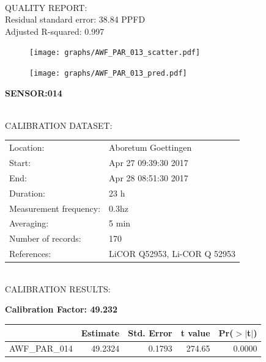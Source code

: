 \documentclass[oneside]{report}
\begin{document}
\hrulefill\\
QUALITY REPORT:\\
Residual standard error: 38.84 PPFD\\
Adjusted R-squared: 0.997



\begin{figure}[H]
  \centering
  \texttt{[image: graphs/AWF\_PAR\_013\_scatter.pdf]}
\end{figure}




\begin{figure}[H]
  \centering
  \texttt{[image: graphs/AWF\_PAR\_013\_pred.pdf]}
\end{figure}

\pagebreak


\begin{center}
\large{\textbf{SENSOR:014}}\\
\end{center}

\hrulefill\\
CALIBRATION DATASET:\\
\begin{table}[h!]
  \centering
  \label{tab:table1}
  \begin{tabular}{ll}
    Location: & Aboretum Goettingen\\ 
    
    
    Start:  & Apr 27 09:39:30 2017 \\
    End:   & Apr 28 08:51:30 2017\\ 
    Duration: & 23 h\\
    Measurement frequency: & 0.3hz\\
    Averaging:  &5 min\\
    Number of records: & 170 \\
    References: & LiCOR Q52953, Li-COR Q 52953 \\
  \end{tabular}
\end{table}

\hrulefill\\
CALIBRATION RESULTS:\\


\begin{center}
\textbf{\large{Calibration Factor: 49.232}}\\
\end{center}
\begin{table}[ht]
\centering
\begin{tabular}{rrrrr}
  \hline
 & Estimate & Std. Error & t value & Pr($>$$|$t$|$) \\ 
  \hline
AWF\_PAR\_014 & 49.2324 & 0.1793 & 274.65 & 0.0000 \\ 
   \hline
\end{tabular}
\end{table}
\end{document}
